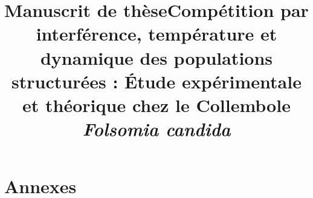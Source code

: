 \documentclass[11.5pt,a4paper,twoside,openright,final]{memoir}
\title{Manuscrit de thèse}
\makeatletter
\newcommand{\partimage}[2][]{\gdef\@partimage{\texttt{[image: \#2]}}}
\makeatother
\begin{document}
\frontmatter





\newpage

\newpage
\newpage



\newpage
\begin{Spacing}{1}
\tableofcontents

\end{Spacing}


\mainmatter

\title{Compétition par interférence, température et dynamique des populations
structurées : \'Etude expérimentale et théorique chez le Collembole
\textit{Folsomia candida}}
\newpage

 
\partimage[height=0.9\textwidth]{FigParts/submit}
\part{Annexes}
\appendix
{}

% 




 






\end{document}
